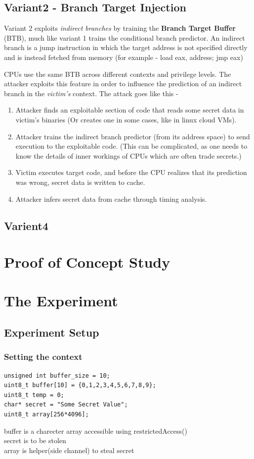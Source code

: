 \documentclass[12pt]{article}
\begin{document}
\subsection{Variant2 - Branch Target Injection}
Variant 2 exploits \textit{indirect branches} by training the \textbf{Branch Target Buffer} (BTB), much like variant 1 trains the conditional branch predictor. An indirect branch is a jump instruction in which the target address is not specified directly and is instead fetched from memory (for example - load eax, address; jmp eax)

CPUs use the same BTB across different contexts and privilege levels. The attacker exploits this feature in order to influence the prediction of an indirect branch in the \textit{victim's} context. The attack goes like this - 
 \begin{enumerate}
 \item Attacker finds an exploitable section of code that reads some secret data in victim's binaries (Or creates one in some cases, like in linux cloud VMs).
 \item Attacker trains the indirect branch predictor (from its address space) to send execution to the exploitable code. (This can be complicated, as one needs to know the details of inner workings of CPUs which are often trade secrets.)
 \item Victim executes target code, and before the CPU realizes that its prediction was wrong, secret data is written to cache.
 \item Attacker infers secret data from cache through timing analysis.
 \end{enumerate}
\subsection{Varient4}
\section{Proof of Concept Study}
\section{The Experiment}
\subsection{Experiment Setup}
\subsubsection{Setting the context}
\begin{lstlisting}[style=CStyle]
unsigned int buffer_size = 10;
uint8_t buffer[10] = {0,1,2,3,4,5,6,7,8,9};
uint8_t temp = 0;
char* secret = "Some Secret Value";
uint8_t array[256*4096];
\end{lstlisting}
buffer is a charecter array accessible using restrictedAccess()\\
secret is to be stolen\\
array is helper(side channel) to steal secret  
\end{document}
